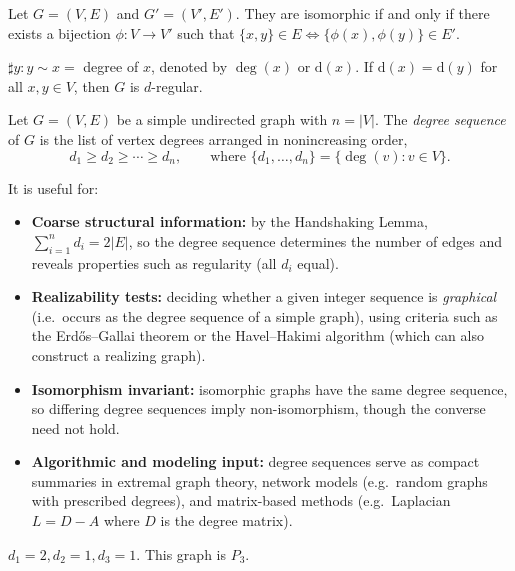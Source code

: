 \documentclass[11pt, a4paper]{ctexrep}
\begin{document}
\begin{definition}
    Let $ G=(V,E) $ and $ G'=(V',E') $. They are isomorphic if and only if there exists a bijection $ \phi: V \to V' $ such that $ \{ x,y \} \in E \Leftrightarrow \{ \phi(x), \phi(y) \} \in E' $.
\end{definition}

\begin{definition}
    $ \sharp y : y \sim x =$ degree of $ x $, denoted by $ \deg(x) $ or $ \mathrm{d} (x)$. If $ \mathrm{d}(x) =\mathrm{d}(y)$ for all $ x,y \in V $, then $ G $ is $ d $-regular.
\end{definition}

\begin{remark}
    Let $G=(V,E)$ be a simple undirected graph with $n=|V|$.  The \emph{degree sequence} of $G$
    is the list of vertex degrees arranged in nonincreasing order,
    \[
        d_1 \ge d_2 \ge \cdots \ge d_n,
        \qquad \text{where } \{d_1,\dots,d_n\}=\{\deg(v):v\in V\}.
    \]

    It is useful for:
    \begin{itemize}
        \item \textbf{Coarse structural information:} by the Handshaking Lemma,
              $\sum_{i=1}^n d_i = 2|E|$, so the degree sequence determines the number of edges and
              reveals properties such as regularity (all $d_i$ equal).
        \item \textbf{Realizability tests:} deciding whether a given integer sequence is
              \emph{graphical} (i.e.\ occurs as the degree sequence of a simple graph), using
              criteria such as the Erd\H{o}s--Gallai theorem or the Havel--Hakimi algorithm
              (which can also construct a realizing graph).
        \item \textbf{Isomorphism invariant:} isomorphic graphs have the same degree sequence,
              so differing degree sequences imply non-isomorphism, though the converse need not hold.
        \item \textbf{Algorithmic and modeling input:} degree sequences serve as compact summaries
              in extremal graph theory, network models (e.g.\ random graphs with prescribed degrees),
              and matrix-based methods (e.g.\ Laplacian $L=D-A$ where $D$ is the degree matrix).
    \end{itemize}
\end{remark}

\begin{example}
    $ d_1=2,d_2=1,d_3=1 $. This graph is $ P_3 $.
\end{example}
\end{document}
